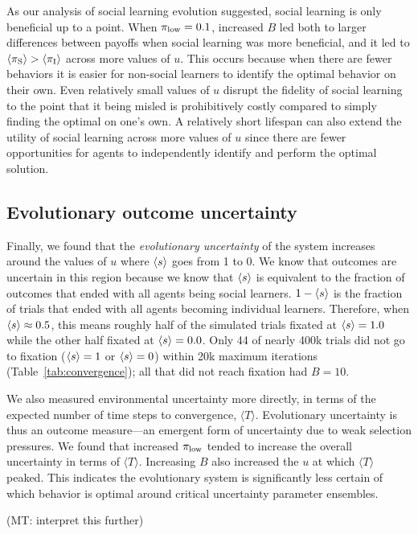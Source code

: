 \documentclass[letterpaper,11.5pt]{scrartcl}
\newcommand{\mt}[1]{{\textcolor{myorange} {({\tiny MT:} #1)}}}
\begin{document}
As our analysis of social learning evolution suggested, social learning is only
beneficial up to a point. When $\pi_{\mathrm{low}}=0.1$, increased $B$ led both to larger
differences between payoffs when social learning was more beneficial, and it
led to $\langle \pi_{\mathrm{S}} \rangle > \langle \pi_{\mathrm{I}} \rangle$ across more values of $u$. This occurs because when there
are fewer behaviors it is easier for non-social learners to identify the
optimal behavior on their own. Even relatively small values of $u$ disrupt
the fidelity of social learning to the point that it being misled is
prohibitively costly compared to simply finding the optimal on one's own.
A relatively short lifespan can also extend the utility of social learning
across more values of $u$ since there are fewer opportunities for agents to
independently identify and perform the optimal solution. 

\subsection{Evolutionary outcome uncertainty} 

Finally, we found that the \emph{evolutionary uncertainty} of the system
increases around the values of $u$ where $\langle s \rangle$ goes from 1 to 0.  We know
that outcomes are uncertain in this region because we know that $\langle s \rangle$
is equivalent to the fraction of outcomes that ended with all agents being
social learners. $1 - \langle s \rangle$ is the fraction of trials that ended with 
all agents becoming individual learners. Therefore, when $\langle s \rangle \approx 0.5$,
this means roughly half of the simulated trials fixated at $\langle s \rangle = 1.0$
while the other half fixated at $\langle s \rangle = 0.0$.
Only 44 of nearly 400k trials did not go to fixation ($\langle s \rangle = 1$ or $\langle s \rangle = 0$) 
within 20k maximum iterations (Table~\ref{tab:convergence}); all that did not
reach fixation had $B=10$. 

We also measured environmental uncertainty more directly, in terms of the
expected number of time steps to convergence, $\langle T \rangle$.
Evolutionary uncertainty is thus an outcome measure---an emergent form of
uncertainty due to weak selection pressures. We found that increased $\pi_{\mathrm{low}}$
tended to increase the overall uncertainty in terms of $\langle T \rangle$.
Increasing $B$ also increased the $u$ at which $\langle T \rangle$ peaked.
This indicates the evolutionary system is significantly less certain of 
which behavior is optimal around critical uncertainty parameter ensembles.

\mt{interpret this further}
\end{document}
